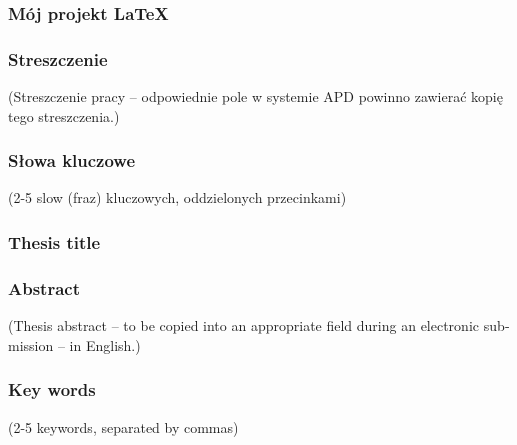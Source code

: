 \subsubsection*{Mój projekt LaTeX} 
\Title

\subsubsection*{Streszczenie}  
(Streszczenie pracy – odpowiednie pole w systemie APD powinno zawierać kopię tego streszczenia.)

\subsubsection*{Słowa kluczowe} 
(2-5 slow (fraz) kluczowych, oddzielonych przecinkami)

\subsubsection*{Thesis title} 
\begin{otherlanguage}{british}
\TitleAlt
\end{otherlanguage}

\subsubsection*{Abstract} 
\begin{otherlanguage}{british}
(Thesis abstract – to be copied into an appropriate field during an electronic submission – in English.)
\end{otherlanguage}
\subsubsection*{Key words}  
\begin{otherlanguage}{british}
(2-5 keywords, separated by commas)
\end{otherlanguage}

